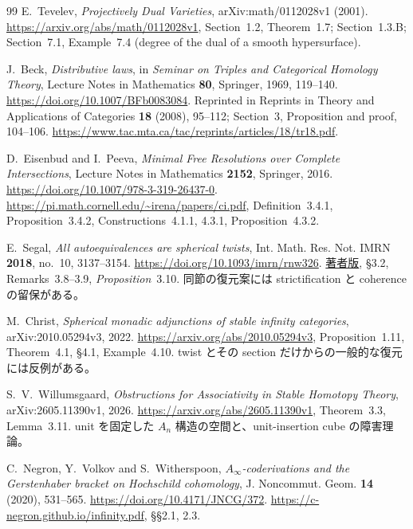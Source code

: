\begin{thebibliography}{99}
E.~Tevelev,
\emph{Projectively Dual Varieties},
arXiv:math/0112028v1 (2001).
\url{https://arxiv.org/abs/math/0112028v1},
Section~1.2, Theorem~1.7; Section~1.3.B;
Section~7.1, Example~7.4 (degree of the dual of a smooth hypersurface).

J.~Beck,
\emph{Distributive laws},
in \emph{Seminar on Triples and Categorical Homology Theory},
Lecture Notes in Mathematics \textbf{80}, Springer, 1969, 119--140.
\url{https://doi.org/10.1007/BFb0083084}.
Reprinted in Reprints in Theory and Applications of Categories \textbf{18} (2008),
95--112; Section~3, Proposition and proof, 104--106.
\url{https://www.tac.mta.ca/tac/reprints/articles/18/tr18.pdf}.

D.~Eisenbud and I.~Peeva,
\emph{Minimal Free Resolutions over Complete Intersections},
Lecture Notes in Mathematics \textbf{2152}, Springer, 2016.
\url{https://doi.org/10.1007/978-3-319-26437-0}.
\url{https://pi.math.cornell.edu/~irena/papers/ci.pdf},
Definition~3.4.1, Proposition~3.4.2, Constructions~4.1.1, 4.3.1,
Proposition~4.3.2.

E.~Segal,
\emph{All autoequivalences are spherical twists},
Int. Math. Res. Not. IMRN \textbf{2018}, no.~10, 3137--3154.
\url{https://doi.org/10.1093/imrn/rnw326}.
\href{https://www.homepages.ucl.ac.uk/~ucaheps/papers/all\%20autoequivalences\%20are\%20spherical\%20twists.pdf}{著者版},
\S3.2, Remarks~3.8--3.9, \emph{Proposition}~3.10.
同節の復元案には strictification と coherence の留保がある。

M.~Christ,
\emph{Spherical monadic adjunctions of stable infinity categories},
arXiv:2010.05294v3, 2022.
\url{https://arxiv.org/abs/2010.05294v3},
Proposition~1.11, Theorem~4.1, \S4.1, Example~4.10.
twist とその section だけからの一般的な復元には反例がある。

S.~V.~Willumsgaard,
\emph{Obstructions for Associativity in Stable Homotopy Theory},
arXiv:2605.11390v1, 2026.
\url{https://arxiv.org/abs/2605.11390v1},
Theorem~3.3, Lemma~3.11.
unit を固定した $A_n$ 構造の空間と、unit-insertion cube の障害理論。

C.~Negron, Y.~Volkov and S.~Witherspoon,
\emph{$A_\infty$-coderivations and the Gerstenhaber bracket on Hochschild cohomology},
J. Noncommut. Geom. \textbf{14} (2020), 531--565.
\url{https://doi.org/10.4171/JNCG/372}.
\url{https://c-negron.github.io/infinity.pdf}, \S\S2.1, 2.3.


\end{thebibliography}
